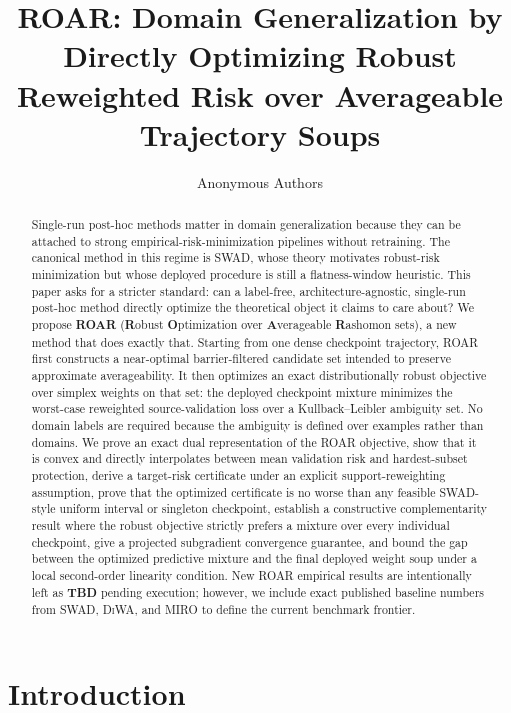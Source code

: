 \documentclass{article}
\title{ROAR: Domain Generalization by Directly Optimizing Robust Reweighted Risk over Averageable Trajectory Soups}
\author{Anonymous Authors}
\newcommand{\TBD}{\textbf{TBD}}
\newcommand{\roar}{\textup{\textsc{ROAR}}}
\newcommand{\swad}{\textup{\textsc{SWAD}}}
\newcommand{\diwa}{\textup{\textsc{DiWA}}}
\newcommand{\miro}{\textup{\textsc{MIRO}}}
\begin{document}
\maketitle

\begin{abstract}
Single-run post-hoc methods matter in domain generalization because they can be attached to strong empirical-risk-minimization pipelines without retraining. The canonical method in this regime is \swad{}, whose theory motivates robust-risk minimization but whose deployed procedure is still a flatness-window heuristic. This paper asks for a stricter standard: can a label-free, architecture-agnostic, single-run post-hoc method directly optimize the theoretical object it claims to care about? We propose \textbf{ROAR} (\textbf{R}obust \textbf{O}ptimization over \textbf{A}verageable \textbf{R}ashomon sets), a new method that does exactly that. Starting from one dense checkpoint trajectory, \roar{} first constructs a near-optimal barrier-filtered candidate set intended to preserve approximate averageability. It then optimizes an exact distributionally robust objective over simplex weights on that set: the deployed checkpoint mixture minimizes the worst-case reweighted source-validation loss over a Kullback--Leibler ambiguity set. No domain labels are required because the ambiguity is defined over examples rather than domains. We prove an exact dual representation of the \roar{} objective, show that it is convex and directly interpolates between mean validation risk and hardest-subset protection, derive a target-risk certificate under an explicit support-reweighting assumption, prove that the optimized certificate is no worse than any feasible \swad{}-style uniform interval or singleton checkpoint, establish a constructive complementarity result where the robust objective strictly prefers a mixture over every individual checkpoint, give a projected subgradient convergence guarantee, and bound the gap between the optimized predictive mixture and the final deployed weight soup under a local second-order linearity condition. New \roar{} empirical results are intentionally left as \TBD{} pending execution; however, we include exact published baseline numbers from \swad{}, \diwa{}, and \miro{} to define the current benchmark frontier.
\end{abstract}

\section{Introduction}
\end{document}
